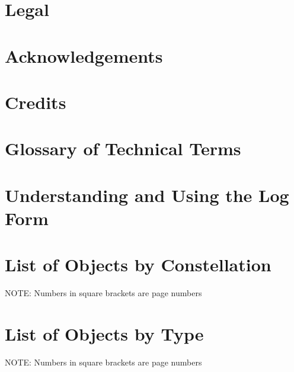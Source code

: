 \documentclass[a4paper,oneside]{book}
\begin{document}
\author{The Astronomy Logbook Project}



\chapter{Legal}
\label{Legal}



\chapter{Acknowledgements}



\chapter{Credits}



\mainmatter



\chapter{Glossary of Technical Terms}



\chapter{Understanding and Using the Log Form}



\twocolumn
\chapter{List of Objects by Constellation}
NOTE: Numbers in square brackets are page numbers \\



\chapter{List of Objects by Type}
NOTE: Numbers in square brackets are page numbers \\


\onecolumn
\end{document}
